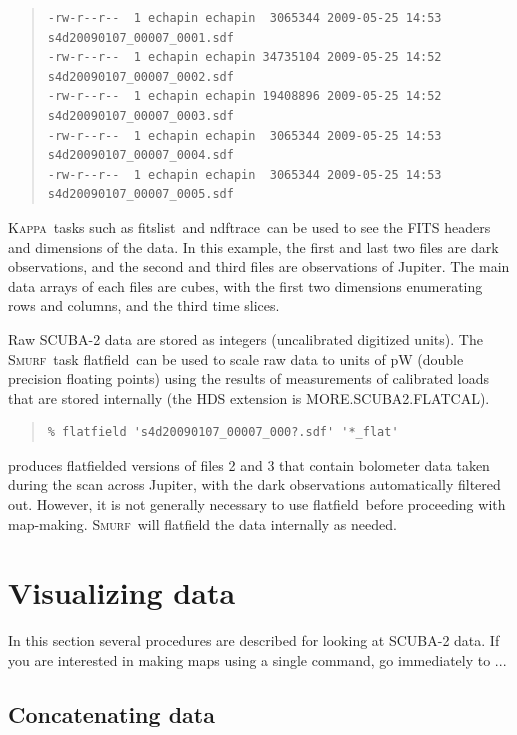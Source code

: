 \documentclass[twoside,11pt]{article}
\newenvironment{myquote}{\begin{quote}\begin{small}}{\end{small}\end{quote}}
\newcommand{\Kappa}{\xref{\textsc{Kappa}}{sun95}{}}
\newcommand{\smurf}{\xref{\textsc{Smurf}}{sun258}{}}
\newcommand{\task}[1]{\textsf{#1}}
\newcommand{\flatfield}{\xref{\task{flatfield}}{sun258}{FLATFIELD}}
\newcommand{\fitslist}{\xref{\task{fitslist}}{sun95}{FITSLIST}}
\newcommand{\ndftrace}{\xref{\task{ndftrace}}{sun95}{NDFTRACE}}
\newcommand{\xref}[3]{#1}
\newcommand{\xlabel}[1]{}
\renewcommand{\_}{\texttt{\symbol{95}}}
\begin{document}
\begin{myquote}
\begin{verbatim}
-rw-r--r--  1 echapin echapin  3065344 2009-05-25 14:53 s4d20090107_00007_0001.sdf
-rw-r--r--  1 echapin echapin 34735104 2009-05-25 14:52 s4d20090107_00007_0002.sdf
-rw-r--r--  1 echapin echapin 19408896 2009-05-25 14:52 s4d20090107_00007_0003.sdf
-rw-r--r--  1 echapin echapin  3065344 2009-05-25 14:53 s4d20090107_00007_0004.sdf
-rw-r--r--  1 echapin echapin  3065344 2009-05-25 14:53 s4d20090107_00007_0005.sdf
\end{verbatim}
\end{myquote}

\Kappa\ tasks such as \fitslist\ and \ndftrace\ can be used to see the
FITS headers and dimensions of the data. In this example, the first
and last two files are dark observations, and the second and third
files are observations of Jupiter. The main data arrays of each files
are cubes, with the first two dimensions enumerating rows and columns,
and the third time slices.

Raw SCUBA-2 data are stored as integers (uncalibrated digitized
units). The \smurf\ task \flatfield\ can be used to scale raw data to
units of pW (double precision floating points) using the results of
measurements of calibrated loads that are stored internally (the HDS
extension is MORE.SCUBA2.FLATCAL).

\begin{myquote}
\begin{verbatim}
% flatfield 's4d20090107_00007_000?.sdf' '*_flat'
\end{verbatim}
\end{myquote}

produces flatfielded versions of files 2 and 3 that contain bolometer
data taken during the scan across Jupiter, with the dark observations
automatically filtered out. However, it is not generally necessary to
use \flatfield\ before proceeding with map-making. \smurf\ will
flatfield the data internally as needed.

\section{\xlabel{time_series}Visualizing data}

In this section several procedures are described for looking at
SCUBA-2 data. If you are interested in making maps using a single command,
go immediately to ...

\subsection{\xlabel{concat}Concatenating data} 
\end{document}
